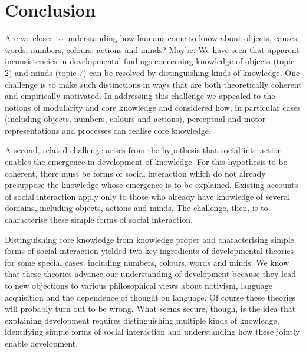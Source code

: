 \documentclass[12pt,\papersize]{extarticle}
\begin{document}

\section{Conclusion}
Are we closer to understanding 
how humans come to know about %
objects,
causes,
words,
numbers,
colours,
actions
and
minds? 
Maybe.
We have seen that apparent inconsistencies in developmental findings concerning knowledge of objects (topic 2) and minds (topic 7) can be resolved by distinguishing kinds of knowledge.
One challenge is to make such distinctions in ways that are both  theoretically coherent and empirically motivated.
In addressing this challenge we appealed to the notions of modularity and core knowledge and considered how, in particular cases (including objects, numbers, colours and actions), perceptual and motor representations and processes can realise core knowledge.

A second, related challenge arises from the hypothesis that social interaction enables the emergence in development of knowledge.  
For this hypothesis to be coherent, there must be forms of social interaction which do not already presuppose the knowledge whose emergence is to be explained.
Existing accounts of social interaction apply only to those who already have knowledge of several domains, including objects, actions and minds.
The challenge, then, is to characterise these simple forms of social interaction.

Distinguishing core knowledge from knowledge proper 
and
characterising simple forms of social interaction
yielded 
two key ingredients of
developmental theories for some special cases, including numbers, colours, words and minds.
We know that these  theories advance our understanding of development because they lead to new objections to various philosophical views about nativism, language acquisition and the dependence of thought on language.
Of course these theories will probably turn out to be wrong.
What seems secure, though, is the idea that explaining development requires 
distinguishing multiple kinds of knowledge, 
identifying simple forms of social interaction 
and 
understanding how 
	these jointly enable development.






\end{document}
